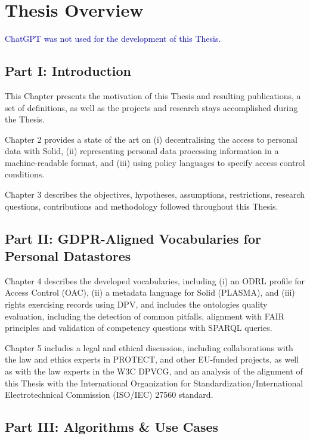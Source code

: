 \section{Thesis Overview}
\label{sec:thesis_overview}

\textcolor{blue}{ChatGPT was not used for the development of this Thesis.}

\subsection*{Part I: Introduction}

This Chapter presents the motivation of this Thesis and resulting publications, a set of definitions, as well as the projects and research stays accomplished during the Thesis.

Chapter 2 provides a state of the art on (i) decentralising the access to personal data with Solid, (ii) representing personal data processing information in a machine-readable format, and (iii) using policy languages to specify access control conditions.

Chapter 3 describes the objectives, hypotheses, assumptions, restrictions, research questions, contributions and methodology followed throughout this Thesis.

\subsection*{Part II: GDPR-Aligned Vocabularies for Personal Datastores}

Chapter 4 describes the developed vocabularies, including (i) an ODRL profile for Access Control (OAC), (ii) a metadata language for Solid (PLASMA), and (iii) rights exercising records using DPV, and includes the ontologies quality evaluation, including the detection of common pitfalls, alignment with FAIR principles and validation of competency questions with SPARQL queries.

Chapter 5 includes a legal and ethical discussion, including collaborations with the law and ethics experts in PROTECT, and other EU-funded projects, as well as with the law experts in the W3C DPVCG, and an analysis of the alignment of this Thesis with the International Organization for Standardization/International Electrotechnical Commission (ISO/IEC) 27560 standard.

\subsection*{Part III: Algorithms \& Use Cases}

